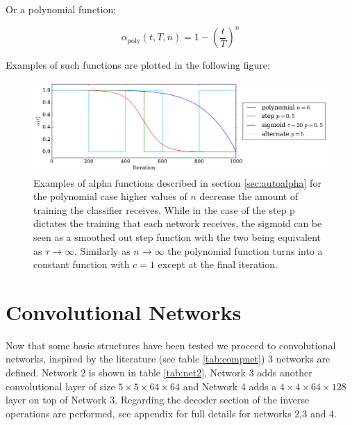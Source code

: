     Or a polynomial function:

    \begin{equation}
      \alpha_{\text{poly}}(t,T,n) = 1 - \left ( \frac{t}{T} \right )^n
    \end{equation}

    Examples of such functions are plotted in the following figure:

    \begin{figure}[!h]
    \centering
    \includegraphics[width =\hsize]{figures/alpha.pdf}
    \caption{Examples of alpha functions described in section \ref{sec:autoalpha}
    for the polynomial case higher values of $n$ decrease the amount of training
    the classifier receives. While in the case of the step p dictates the training
    that each network receives, the sigmoid can be seen as a smoothed out step function
    with the two being equivalent as $ \tau \rightarrow \infty$. Similarly as $n \rightarrow \infty$
    the polynomial function turns into a constant function with $c=1$ except at the final
    iteration.}
    \label{fig:alpha_functions}
    \end{figure}


  \section{Convolutional Networks}

    Now that some basic structures have been tested we proceed to convolutional networks,
    inspired by the literature (see table \ref{tab:compnet}) 3 networks are defined.
    Network 2 is shown in table \ref{tab:net2}, Network 3
    adds another convolutional layer of size $5\times 5 \times 64 \times 64$ and
    Network 4 adds a $4\times 4 \times 64 \times 128$ layer
    on top of Network 3. Regarding the decoder section of the inverse operations are
    performed, see appendix \label{appendix1} for full details
    for networks 2,3 and 4.

